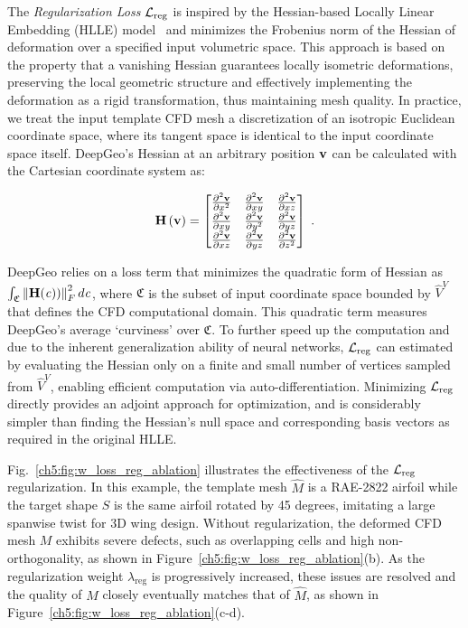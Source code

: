 The {\it Regularization Loss} $\mathcal{L}_{\rm {reg}}$ is inspired by the Hessian-based Locally Linear Embedding (HLLE) model~\cite{ai.Donoho2003} and minimizes the Frobenius norm of the Hessian of deformation over a specified input volumetric space. This approach is based on the property that a vanishing Hessian guarantees locally isometric deformations, preserving the local geometric structure and effectively implementing the deformation as a rigid transformation, thus maintaining mesh quality.
In practice, we treat the input template CFD mesh a discretization of an isotropic Euclidean coordinate space, where its tangent space is identical to the input coordinate space itself. DeepGeo's Hessian at an arbitrary position $\mathbf{v}$ can be calculated with the Cartesian coordinate system as:
%
\begin{small}
\begin{align}
       \mathbf{H} \left( \mathbf{v} \right) 
      = \begin{bmatrix}
            \frac{\partial^2 \mathbf{v}}{\partial x^2} & \frac{\partial^2 \mathbf{v}}{\partial xy} &  \frac{\partial^2 \mathbf{v}}{\partial xz} \\
            \frac{\partial^2 \mathbf{v}}{\partial xy} & \frac{\partial^2 \mathbf{v}}{\partial y^2} &  \frac{\partial^2 \mathbf{v}}{\partial yz} \\
            \frac{\partial^2 \mathbf{v}}{\partial xz} & \frac{\partial^2 \mathbf{v}}{\partial yz} &  \frac{\partial^2 \mathbf{v}}{\partial z^2} \\
        \end{bmatrix} \; .
\end{align}
\label{ch5:eq:L_reg} 
\end{small}
%
DeepGeo relies on a loss term that minimizes the quadratic form of Hessian as $\int_{\mathfrak{C}} \left\| \mathbf{H}(\mathit{c})) \right\|^2_F d\mathit{c}$, where $\mathfrak{C}$ is the subset of input coordinate space bounded by $\hat{V}^V$ that defines the CFD computational domain.
This quadratic term measures DeepGeo's average ‘curviness’ over $\mathfrak{C}$.
To further speed up the computation and due to the inherent generalization ability of neural networks, $\mathcal{L}_{\rm reg}$ can estimated by evaluating the Hessian only on a finite and small number of vertices sampled from $\hat{V}^V$, enabling efficient computation via auto-differentiation.
Minimizing $\mathcal{L}_{\rm reg}$ directly provides an adjoint approach for optimization, and is considerably simpler than finding the Hessian’s null space and corresponding basis vectors as required in the original HLLE.

Fig.~\ref{ch5:fig:w_loss_reg_ablation} illustrates the effectiveness of the $\mathcal{L}_{\rm reg}$ regularization. In this example, the template mesh $\hat{M}$ is a RAE-2822 airfoil while the target shape $S$ is the same airfoil rotated by 45 degrees, imitating a large spanwise twist for 3D wing design. Without regularization, the deformed CFD mesh $M$ exhibits severe defects, such as overlapping cells and high non-orthogonality, as shown in Figure~\ref{ch5:fig:w_loss_reg_ablation}(b). As the regularization weight $\lambda_{\text{reg}}$ is progressively increased, these issues are resolved and the quality of $M$ closely eventually matches that of $\hat{M}$, as shown in Figure~\ref{ch5:fig:w_loss_reg_ablation}(c-d).

